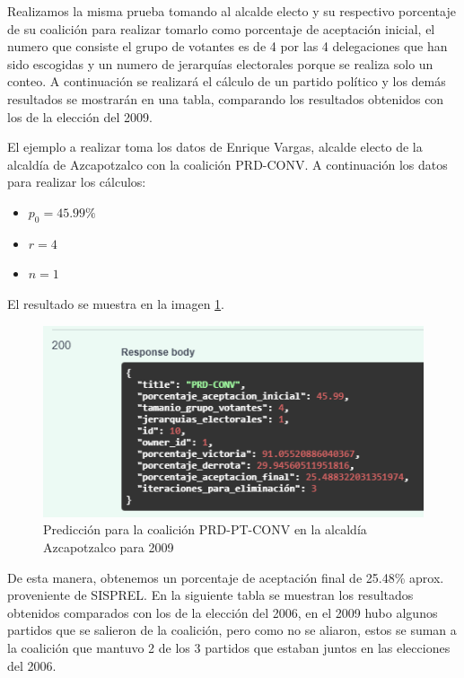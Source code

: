 Realizamos la misma prueba tomando al alcalde electo y su respectivo porcentaje de su coalición para realizar tomarlo como porcentaje de aceptación inicial, el numero que consiste el grupo de votantes es de 4 por las 4 delegaciones que han sido escogidas y un numero de jerarquías electorales porque se realiza solo un conteo. A continuación se realizará el cálculo de un partido político y los demás resultados se mostrarán en una tabla, comparando los resultados obtenidos con los de la elección del 2009.

El ejemplo a realizar toma los datos de Enrique Vargas, alcalde electo de la alcaldía de Azcapotzalco con la coalición PRD-CONV. A continuación los datos para realizar los cálculos:

\begin{itemize}
    \item $p_0 = 45.99\%$
    \item $r = 4$
    \item $n = 1$
\end{itemize}

El resultado se muestra en la imagen \ref{graphic:PRDPTCONV2006}.
\begin{figure}[!htb]
    \centering
    \includegraphics[scale=.5]{TT/img/pruebas/PRD-CONV AZC 2006.png}
    \caption{Predicción para la coalición PRD-PT-CONV en la alcaldía Azcapotzalco para 2009}
    \label{graphic:PRDPTCONV2006}
\end{figure}

De esta manera, obtenemos un porcentaje de aceptación final de 25.48\% aprox. proveniente de SISPREL. En la siguiente tabla se muestran los resultados obtenidos comparados con los de la elección del 2006, en el 2009 hubo algunos partidos que se salieron de la coalición, pero como no se aliaron, estos se suman a la coalición que mantuvo 2 de los 3 partidos que estaban juntos en las elecciones del 2006.

